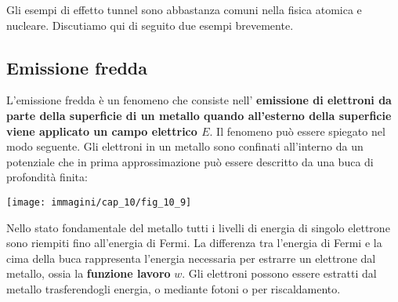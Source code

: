 \documentclass[a4paper,12pt,oneside]{book}
\begin{document}
Gli esempi di effetto tunnel sono abbastanza comuni nella fisica atomica e nucleare. Discutiamo qui di seguito due esempi brevemente.
\subsection{Emissione fredda}
L'emissione fredda è un fenomeno che consiste nell' \textbf{emissione di elettroni da parte della superficie di un metallo quando all'esterno della superficie viene applicato un campo elettrico $E$}. Il fenomeno può essere spiegato nel modo seguente. Gli elettroni in un metallo sono confinati all'interno da un potenziale che in prima approssimazione può essere descritto da una buca di profondità finita:
\begin{center}
\texttt{[image: immagini/cap\_10/fig\_10\_9]}
\end{center} 
Nello stato fondamentale del metallo tutti i livelli di energia di singolo elettrone sono riempiti fino all'energia di Fermi. La differenza tra l'energia di Fermi e la cima della buca rappresenta l'energia necessaria per estrarre un elettrone dal metallo, ossia la \textbf{funzione lavoro} $w$. 
Gli elettroni possono essere estratti dal metallo trasferendogli energia, o mediante fotoni o per riscaldamento.\\
\end{document}
